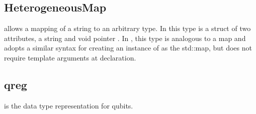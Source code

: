 \subsection{\textbf{HeterogeneousMap}}\label{subsec:HeterogeneousMap}
 allows a mapping of a string to an arbitrary type. In \Clang this type is a struct of two attributes, a string  and void pointer . In \Cpp, this type is analogous to a map and adopts a similar syntax for creating an instance of  as the \Cpp std::map, but does not require template arguments at declaration. 

\subsection{\textbf{qreg}}\label{subsec:qreg}
 is the data type representation for qubits. 
